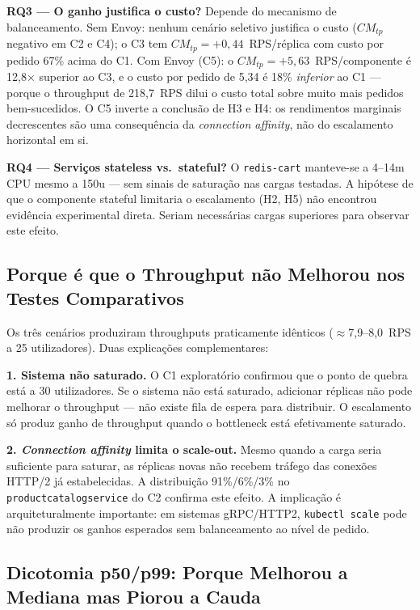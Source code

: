 \documentclass[acmsmall,screen=true,nonacm]{acmart}
\begin{document}
\textbf{RQ3 — O ganho justifica o custo?} Depende do mecanismo de balanceamento. Sem Envoy: nenhum cenário seletivo justifica o custo ($CM_{tp}$ negativo em C2 e C4); o C3 tem $CM_{tp}=+0{,}44$~RPS/réplica com custo por pedido 67\% acima do C1. Com Envoy (C5): o $CM_{tp}=+5{,}63$~RPS/componente é 12,8× superior ao C3, e o custo por pedido de 5,34 é 18\% \emph{inferior} ao C1 — porque o throughput de 218,7~RPS dilui o custo total sobre muito mais pedidos bem-sucedidos. O C5 inverte a conclusão de H3 e H4: os rendimentos marginais decrescentes são uma consequência da \textit{connection affinity}, não do escalamento horizontal em si.

\textbf{RQ4 — Serviços stateless vs.\ stateful?} O \texttt{redis-cart} manteve-se a 4--14m CPU mesmo a 150u — sem sinais de saturação nas cargas testadas. A hipótese de que o componente stateful limitaria o escalamento (H2, H5) não encontrou evidência experimental direta. Seriam necessárias cargas superiores para observar este efeito.

\subsection{Porque é que o Throughput não Melhorou nos Testes Comparativos}

Os três cenários produziram throughputs praticamente idênticos ($\approx$7{,}9--8{,}0~RPS a 25 utilizadores). Duas explicações complementares:

\textbf{1. Sistema não saturado.} O C1 exploratório confirmou que o ponto de quebra está a 30 utilizadores. Se o sistema não está saturado, adicionar réplicas não pode melhorar o throughput — não existe fila de espera para distribuir. O escalamento só produz ganho de throughput quando o bottleneck está efetivamente saturado.

\textbf{2. \textit{Connection affinity} limita o scale-out.} Mesmo quando a carga seria suficiente para saturar, as réplicas novas não recebem tráfego das conexões HTTP/2 já estabelecidas. A distribuição 91\%/6\%/3\% no \texttt{productcatalogservice} do C2 confirma este efeito. A implicação é arquiteturalmente importante: em sistemas gRPC/HTTP2, \texttt{kubectl scale} pode não produzir os ganhos esperados sem balanceamento ao nível de pedido.

\subsection{Dicotomia p50/p99: Porque Melhorou a Mediana mas Piorou a Cauda}
\end{document}
